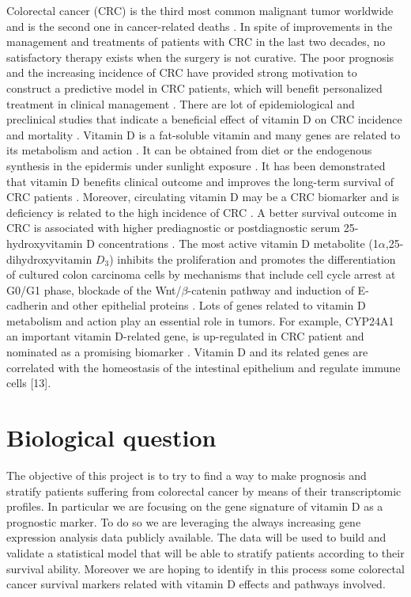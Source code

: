 \documentclass[fleqn,10pt]{SelfArx} %
\begin{document}
Colorectal cancer (CRC) is the third most common malignant tumor worldwide and is the second one in cancer-related deaths \cite{Ferlay2018-pg}. In spite of improvements in the management and treatments of patients with CRC in the last two decades, no satisfactory therapy exists when the surgery is not curative. The poor prognosis and the increasing incidence of CRC have provided strong motivation to construct a predictive model in CRC patients, which will benefit personalized treatment in clinical management \cite{Bu2021-xn}.
There are lot of epidemiological and preclinical studies that indicate a beneficial effect of vitamin D on CRC incidence and mortality \cite{Pereira2012-pf} \cite{Giovannucci2013-ss}.
Vitamin D is a fat-soluble vitamin and many genes are related to its metabolism and action \cite{Fedirko2019-ai}. It can be obtained from diet or the endogenous synthesis in the epidermis under sunlight exposure \cite{Saraff2016-dr}. It has been demonstrated that vitamin D benefits clinical outcome and improves the long-term survival of CRC patients \cite{Xu2021-vb}. Moreover, circulating vitamin D may be a CRC biomarker and is deficiency is related to the high incidence of CRC \cite{Meeker2016-tr}.
A better survival outcome in CRC is associated with higher prediagnostic or postdiagnostic serum 25-hydroxyvitamin D concentrations \cite{Zgaga2014-dd}. The most active vitamin D metabolite (1$\alpha$,25-dihydroxyvitamin $D_3$) inhibits the proliferation and promotes the differentiation of cultured colon carcinoma cells by mechanisms that include cell cycle arrest at G0/G1 phase, blockade of the Wnt/$\beta$-catenin pathway and induction of E-cadherin and other epithelial proteins \cite{Pereira2012-pf} \cite{Feldman2014-mh} \cite{Palmer2001-bh}.
Lots of genes related to vitamin D metabolism and action play an essential role in tumors. For example, CYP24A1 an important vitamin D-related gene, is up-regulated in CRC patient and nominated as a promising biomarker \cite{Sadeghi2020-ci}. Vitamin D and its related genes are correlated with the homeostasis of the intestinal epithelium and regulate immune cells [13].


\section{Biological question}
The objective of this project is to try to find a way to make prognosis and stratify patients suffering from colorectal cancer by means of their transcriptomic profiles.
In particular we are focusing on the gene signature of vitamin D as a prognostic marker.
To do so we are leveraging the always increasing gene expression analysis data publicly available.
The data will be used to build and validate a statistical model that will be able to stratify patients according to their survival ability.
Moreover we are hoping to identify in this process some colorectal cancer survival markers related with vitamin D effects and pathways involved.
\end{document}
